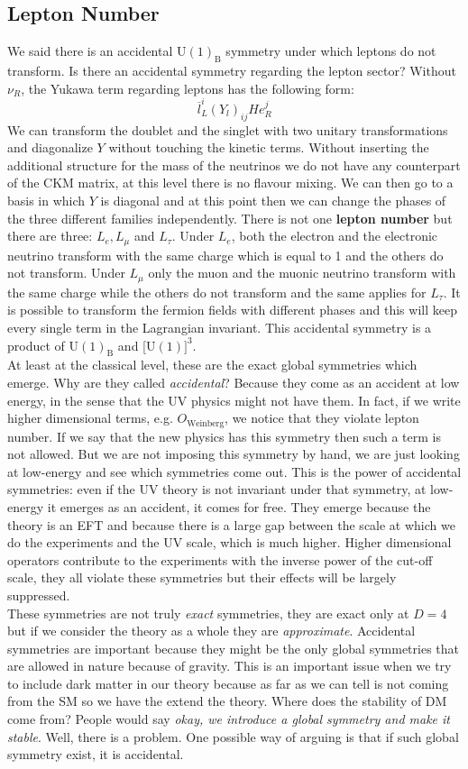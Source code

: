 \documentclass[../main.tex]{subfiles}
\begin{document}
\subsection{Lepton Number}
We said there is an accidental U$(1)_{\text{B}}$ symmetry under which leptons do not transform. Is there an accidental symmetry regarding the lepton sector? Without $\nu_R$, the Yukawa term regarding leptons has the following form:
\[
\overline{l}_L^i(Y_l)_{ij}He_R^j
\]
We can transform the doublet and the singlet with two unitary transformations and diagonalize $Y$ without touching the kinetic terms. Without inserting the additional structure for the mass of the neutrinos we do not have any counterpart of the CKM matrix, at this level there is no flavour mixing. We can then go to a basis in which $Y$ is diagonal and at this point then we can change the phases of the three different families independently. There is not one \textbf{lepton number} but there are three: $L_e, L_\mu$ and $L_\tau$. Under $L_e$, both the electron and the electronic neutrino transform with the same charge which is equal to 1 and the others do not transform. Under $L_\mu$ only the muon and the muonic neutrino transform with the same charge while the others do not transform and the same applies for $L_\tau$. It is possible to transform the fermion fields with different phases and this will keep every single term in the Lagrangian invariant. This accidental symmetry is a product of U$(1)_{\text{B}}$ and [U$(1)]^3$.\\
At least at the classical level, these are the exact global symmetries which emerge. Why are they called \textit{accidental}? Because they come as an accident at low energy, in the sense that the UV physics might not have them. In fact, if we write higher dimensional terms, e.g. $O_{\text{Weinberg}}$, we notice that they violate lepton number. If we say that the new physics has this symmetry then such a term is not allowed. But we are not imposing this symmetry by hand, we are just looking at low-energy and see which symmetries come out. This is the power of accidental symmetries: even if the UV theory is not invariant under that symmetry, at low-energy it emerges as an accident, it comes for free. They emerge because the theory is an EFT and because there is a large gap between the scale at which we do the experiments and the UV scale, which is much higher. Higher dimensional operators contribute to the experiments with the inverse power of the cut-off scale, they all violate these symmetries but their effects will be largely suppressed.\\
These symmetries are not truly \textit{exact} symmetries, they are exact only at $D=4$ but if we consider the theory as a whole they are \textit{approximate}. Accidental symmetries are important because they might be the only global symmetries that are allowed in nature because of gravity. This is an important issue when we try to include dark matter in our theory because as far as we can tell is not coming from the SM so we have the extend the theory. Where does the stability of DM come from? People would say \textit{okay, we introduce a global symmetry and make it stable}. Well, there is a problem. One possible way of arguing is that if such global symmetry exist, it is accidental.
\end{document}
